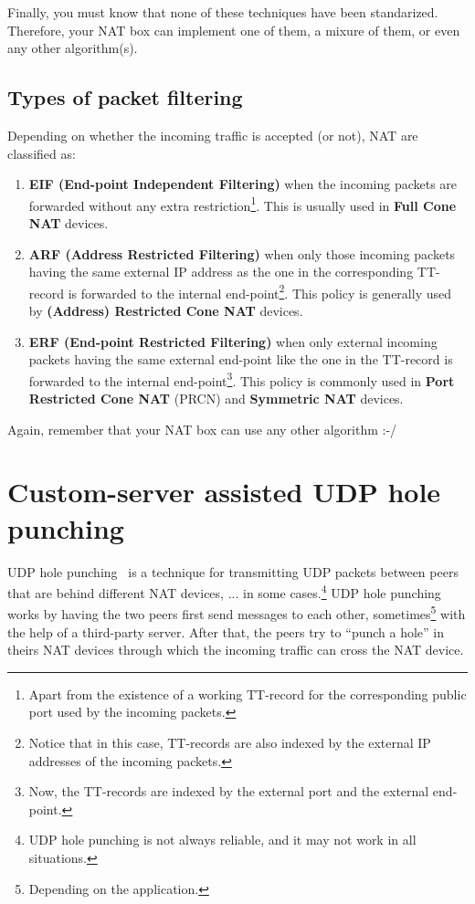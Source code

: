 Finally, you must know that none of these techniques have been
standarized. Therefore, your NAT box can implement one of them, a
mixure of them, or even any other algorithm(s).

\subsection{Types of packet filtering}

Depending on whether the incoming traffic is accepted (or not), NAT are
classified as:

\begin{enumerate}
\item \textbf{EIF (End-point Independent Filtering)} when the incoming
  packets are forwarded without any extra restriction\footnote{Apart
  from the existence of a working TT-record for the corresponding
  public port used by the incoming packets.}. This is usually used in
  \textbf{Full Cone NAT} devices.
\item \textbf{ARF (Address Restricted Filtering)} when only those incoming
  packets having the same external IP address as the one in the
  corresponding TT-record is forwarded to the internal
  end-point\footnote{Notice that in this case, TT-records are also
    indexed by the external IP addresses of the incoming
    packets.}. This policy is generally used by \textbf{(Address)
    Restricted Cone NAT} devices.
\item \textbf{ERF (End-point Restricted Filtering)} when only external
  incoming packets having the same external end-point like the one in
  the TT-record is forwarded to the internal end-point\footnote{Now,
  the TT-records are indexed by the external port and the external
  end-point.}. This policy is commonly used in \textbf{Port Restricted
    Cone NAT} (PRCN) and \textbf{Symmetric NAT} devices.
\end{enumerate}

Again, remember that your NAT box can use any other algorithm :-/

\section{Custom-server assisted UDP hole punching}

UDP hole punching~\cite{srisuresh2008state} is a technique for
transmitting UDP packets between peers that are behind different NAT
devices, ... in some cases.\footnote{UDP hole punching is not always
reliable, and it may not work in all situations.} UDP hole punching
works by having the two peers first send messages to each other,
sometimes\footnote{Depending on the application.} with the help of a
third-party server. After that, the peers try to ``punch a hole'' in
theirs NAT devices through which the incoming traffic can cross the
NAT device.


